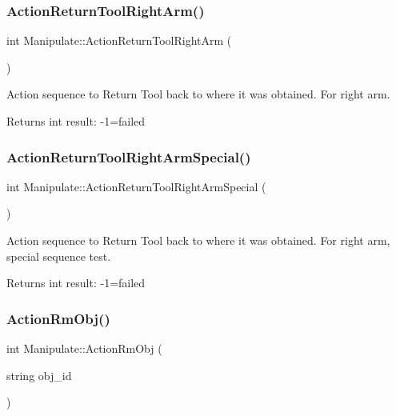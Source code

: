 \subsubsection{\texorpdfstring{Action\+Return\+Tool\+Right\+Arm()}{ActionReturnToolRightArm()}}
{\footnotesize\ttfamily int Manipulate\+::\+Action\+Return\+Tool\+Right\+Arm (\begin{DoxyParamCaption}{ }\end{DoxyParamCaption})\hspace{0.3cm}{\ttfamily [private]}}



Action sequence to Return Tool back to where it was obtained. For right arm. 

\begin{DoxyReturn}{Returns}
int result\+: -\/1=failed 
\end{DoxyReturn}
\mbox{\label{structManipulate_a0ce9ec47f0cf4f42cdf0dfcf29387ebb}} 
\subsubsection{\texorpdfstring{Action\+Return\+Tool\+Right\+Arm\+Special()}{ActionReturnToolRightArmSpecial()}}
{\footnotesize\ttfamily int Manipulate\+::\+Action\+Return\+Tool\+Right\+Arm\+Special (\begin{DoxyParamCaption}{ }\end{DoxyParamCaption})\hspace{0.3cm}{\ttfamily [private]}}



Action sequence to Return Tool back to where it was obtained. For right arm, special sequence test. 

\begin{DoxyReturn}{Returns}
int result\+: -\/1=failed 
\end{DoxyReturn}
\mbox{\label{structManipulate_a5d17ffae09965e37c79af214bdcc99fd}} 
\subsubsection{\texorpdfstring{Action\+Rm\+Obj()}{ActionRmObj()}}
{\footnotesize\ttfamily int Manipulate\+::\+Action\+Rm\+Obj (\begin{DoxyParamCaption}\item[{string}]{obj\+\_\+id }\end{DoxyParamCaption})\hspace{0.3cm}{\ttfamily [private]}}



